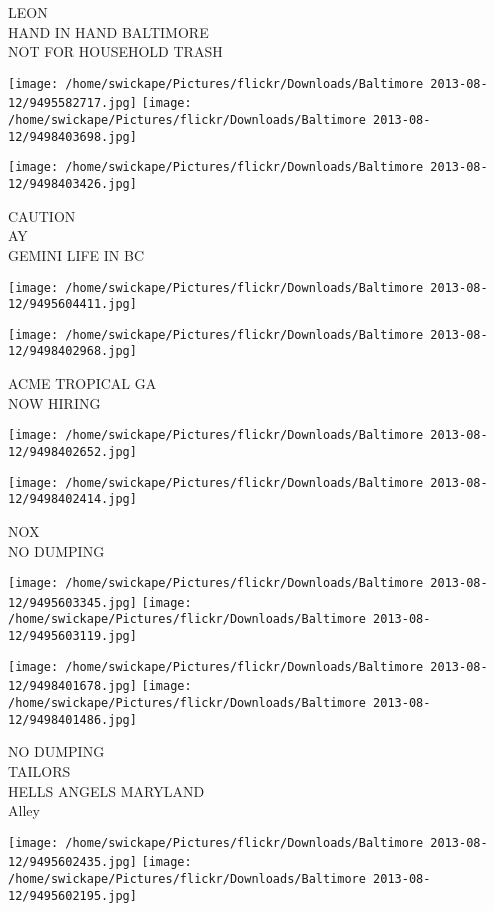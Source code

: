 \documentclass[10pt,letterpaper]{article}
\begin{document}
LEON\\
HAND IN HAND BALTIMORE\\
NOT FOR HOUSEHOLD TRASH
\pagebreak

\texttt{[image: /home/swickape/Pictures/flickr/Downloads/Baltimore 2013-08-12/9495582717.jpg]}
\texttt{[image: /home/swickape/Pictures/flickr/Downloads/Baltimore 2013-08-12/9498403698.jpg]}

\texttt{[image: /home/swickape/Pictures/flickr/Downloads/Baltimore 2013-08-12/9498403426.jpg]}

CAUTION\\
AY\\
GEMINI LIFE IN BC
\pagebreak

\texttt{[image: /home/swickape/Pictures/flickr/Downloads/Baltimore 2013-08-12/9495604411.jpg]}

\vspace{0.25in}
\texttt{[image: /home/swickape/Pictures/flickr/Downloads/Baltimore 2013-08-12/9498402968.jpg]}

ACME TROPICAL GA\\
NOW HIRING
\pagebreak

\texttt{[image: /home/swickape/Pictures/flickr/Downloads/Baltimore 2013-08-12/9498402652.jpg]}

\vspace{0.25in}
\texttt{[image: /home/swickape/Pictures/flickr/Downloads/Baltimore 2013-08-12/9498402414.jpg]}

NOX\\
NO DUMPING
\pagebreak

\texttt{[image: /home/swickape/Pictures/flickr/Downloads/Baltimore 2013-08-12/9495603345.jpg]}
\texttt{[image: /home/swickape/Pictures/flickr/Downloads/Baltimore 2013-08-12/9495603119.jpg]}

\texttt{[image: /home/swickape/Pictures/flickr/Downloads/Baltimore 2013-08-12/9498401678.jpg]}
\texttt{[image: /home/swickape/Pictures/flickr/Downloads/Baltimore 2013-08-12/9498401486.jpg]}

NO DUMPING\\
TAILORS\\
HELLS ANGELS MARYLAND\\
Alley
\pagebreak

\texttt{[image: /home/swickape/Pictures/flickr/Downloads/Baltimore 2013-08-12/9495602435.jpg]}
\texttt{[image: /home/swickape/Pictures/flickr/Downloads/Baltimore 2013-08-12/9495602195.jpg]}
\end{document}
